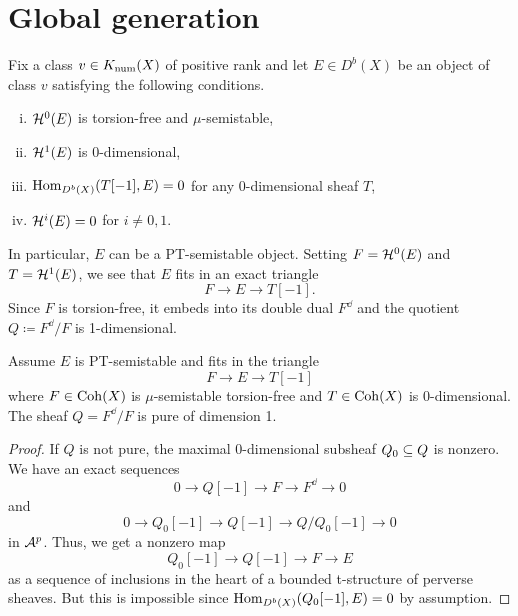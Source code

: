 \section{Global generation}


Fix a class $v \in K_{\mathrm{num}}(X)$ of positive rank and let $E \in D^b(X)$ be an object of class $v$ satisfying the following conditions.
\begin{enumerate}[(i)]
    \item $\mathcal{H}^0(E)$ is torsion-free and $\mu$-semistable,
    \item $\mathcal{H}^1(E)$ is 0-dimensional,
    \item $\mathrm{Hom}_{D^b(X)}(T[-1], E) = 0$ for any 0-dimensional sheaf $T$,
    \item $\mathcal{H}^i(E) = 0$ for $i \neq 0, 1$.
\end{enumerate}
In particular, $E$ can be a PT-semistable object. Setting $F = \mathcal{H}^0(E)$ and $T = \mathcal{H}^1(E)$, we see that $E$ fits in an exact triangle
\[ F \to E \to T[-1]. \]
Since $F$ is torsion-free, it embeds into its double dual $F^\dd$ and the quotient $Q \coloneqq F^\dd/F$ is 1-dimensional.
\begin{lem}
Assume $E$ is PT-semistable and fits in the triangle
\[ F \to E \to T[-1] \]
where $F \in \operatorname{\mathrm{Coh}}(X)$ is $\mu$-semistable torsion-free and $T \in \operatorname{\mathrm{Coh}}(X)$ is 0-dimensional. The sheaf $Q = F^\dd/F$ is pure of dimension 1.
\end{lem}
\begin{proof}
If $Q$ is not pure, the maximal 0-dimensional subsheaf $Q_0 \subseteq Q$ is nonzero. We have an exact sequences
\[ 0 \to Q[-1] \to F \to F^\dd \to 0 \]
and
\[ 0 \to Q_0[-1] \to Q[-1] \to Q/Q_0[-1] \to 0 \]
in $\mathcal{A}^p$. Thus, we get a nonzero map
\[ Q_0[-1] \to Q[-1] \to F \to E \]
as a sequence of inclusions in the heart of a bounded t-structure of perverse sheaves. But this is impossible since $\mathrm{Hom}_{D^b(X)}(Q_0[-1], E) = 0$ by assumption.
\end{proof}

